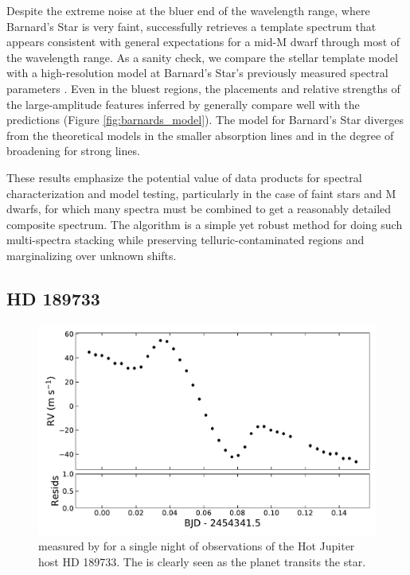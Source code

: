 \documentclass[modern]{aastex62}
\newcommand{\Mdwarf}{Barnard's Star\xspace} %
\begin{document}
{Despite the extreme noise at the bluer end of the wavelength range, where \Mdwarf is very faint, \wobble successfully retrieves a template spectrum that appears consistent with general expectations for a mid-M dwarf through most of the \HARPS wavelength range. 
As a sanity check, we compare the \wobble stellar template model with a high-resolution \PHOENIX model at \Mdwarf's previously measured spectral parameters \citep[\teff = 3200 K, \logg = 5.0, and \mh = $-0.5$;][and references therein]{Husser2013, Artigau2018}. 
Even in the bluest regions, the placements and relative strengths of the large-amplitude features inferred by \wobble generally compare well with the \PHOENIX predictions (Figure \ref{fig:barnards_model}). 
The \wobble model for \Mdwarf diverges from the theoretical models in the smaller absorption lines and in the degree of broadening for strong lines.  

These results emphasize the potential value of \wobble data products for spectral characterization and model testing, particularly in the case of faint stars and M dwarfs, for which many spectra must be combined to get a reasonably detailed composite spectrum. 
The \wobble algorithm is a simple yet robust method for doing such multi-spectra stacking while preserving telluric-contaminated regions and marginalizing over unknown \RV shifts.

\subsection{HD 189733}

\begin{figure}
\centering
\includegraphics[width=5in]{hd189_rm}
\caption{\RVs measured by \wobble for a single night of observations of the Hot Jupiter host HD 189733. The \RM is clearly seen as the planet transits the star. }
\label{fig:hd189_rm}
\end{figure}

}
\end{document}
